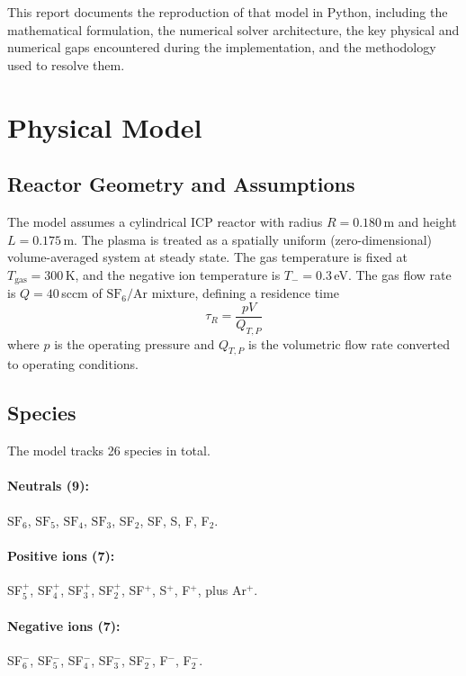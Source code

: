 \documentclass[11pt,a4paper]{article}
\newcommand{\SFsix}{\mathrm{SF}_6}
\newcommand{\SFfive}{\mathrm{SF}_5}
\newcommand{\SFfour}{\mathrm{SF}_4}
\newcommand{\SFthree}{\mathrm{SF}_3}
\newcommand{\Ar}{\mathrm{Ar}}
\begin{document}
This report documents the reproduction of that model in Python, including the mathematical formulation, the numerical solver architecture, the key physical and numerical gaps encountered during the implementation, and the methodology used to resolve them.

\section{Physical Model}

\subsection{Reactor Geometry and Assumptions}

The model assumes a cylindrical ICP reactor with radius $R = 0.180$\,m and height $L = 0.175$\,m.  The plasma is treated as a spatially uniform (zero-dimensional) volume-averaged system at steady state.  The gas temperature is fixed at $T_\mathrm{gas} = 300$\,K, and the negative ion temperature is $T_- = 0.3$\,eV.  The gas flow rate is $Q = 40$\,sccm of $\SFsix/\Ar$ mixture, defining a residence time
\begin{equation}
\tau_R = \frac{p V}{Q_{T,P}}
\end{equation}
where $p$ is the operating pressure and $Q_{T,P}$ is the volumetric flow rate converted to operating conditions.

\subsection{Species}

The model tracks 26 species in total.

\paragraph{Neutrals (9):} $\SFsix$, $\SFfive$, $\SFfour$, $\SFthree$, SF$_2$, SF, S, F, F$_2$.

\paragraph{Positive ions (7):} SF$_5^+$, SF$_4^+$, SF$_3^+$, SF$_2^+$, SF$^+$, S$^+$, F$^+$, plus Ar$^+$.

\paragraph{Negative ions (7):} SF$_6^-$, SF$_5^-$, SF$_4^-$, SF$_3^-$, SF$_2^-$, F$^-$, F$_2^-$.
\end{document}
